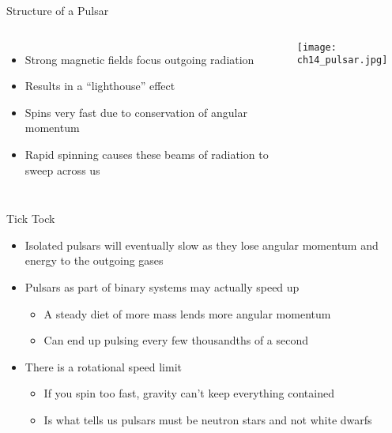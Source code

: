 \documentclass[pdf, aspectratio=169]{beamer}
\begin{document}
\begin{frame}{Structure of a Pulsar}
  \begin{columns}
	\begin{itemize}
	  \item Strong magnetic fields focus outgoing radiation
	  \item Results in a ``lighthouse'' effect
	  \item Spins very fast due to conservation of angular momentum
	  \item Rapid spinning causes these beams of radiation to sweep across us
	\end{itemize}
	\begin{center}
	  \texttt{[image: ch14\_pulsar.jpg]}
	\end{center}
  \end{columns}
\end{frame}


\begin{frame}{Tick Tock}
  \begin{itemize}
	\item Isolated pulsars will eventually slow as they lose angular momentum and energy to the outgoing gases
	\item Pulsars as part of binary systems may actually speed up
	  \begin{itemize}
		\item A steady diet of more mass lends more angular momentum
		\item Can end up pulsing every few thousandths of a second
	  \end{itemize}
	\item There is a rotational speed limit
	  \begin{itemize}
		\item If you spin too fast, gravity can't keep everything contained
		\item Is what tells us pulsars must be neutron stars and not white dwarfs
	  \end{itemize}
  \end{itemize}
\end{frame}
\end{document}
